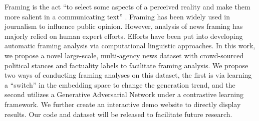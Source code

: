 Framing is the act ``to select some aspects of a perceived reality and make them more salient in a communicating text'' \cite{entman1993}. Framing has been widely used in journalism to influence public opinion. However, analysis of news framing has majorly relied on human expert efforts. Efforts have been put into developing automatic framing analysis via computational linguistic approaches. In this work, we propose a novel large-scale, multi-agency news dataset with crowd-sourced political stances and factuality labels to facilitate framing analysis. We propose two ways of conducting framing analyses on this dataset, the first is via learning a ``switch'' in the embedding space to change the generation trend, and the second utilizes a Generative Adversarial Network under a contrastive learning framework. We further create an interactive demo website to directly display results. Our code and dataset will be released to facilitate future research.